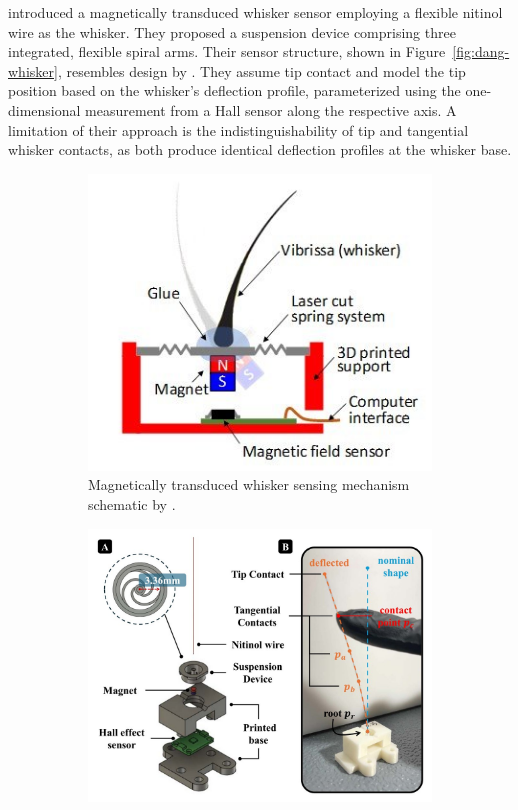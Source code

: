 \textcite{dang2025whisker} introduced a magnetically transduced whisker sensor employing a flexible nitinol wire as the whisker.
They proposed a suspension device comprising three integrated, flexible spiral arms.
Their sensor structure, shown in Figure~\ref{fig:dang-whisker}, resembles design by \citeauthor{8968518}.
They assume tip contact and model the tip position based on the whisker's deflection profile, parameterized using the one-dimensional measurement from a Hall sensor along the respective axis.
A limitation of their approach is the indistinguishability of tip and tangential whisker contacts, as both produce identical deflection profiles at the whisker base.

\begin{figure}[htb]
    \centering
    \begin{subfigure}{0.48\textwidth}
        \centering
        \includegraphics[width=\textwidth]{figures/kim-velez-whisker}
        \caption{Magnetically transduced whisker sensing mechanism schematic by \textcite{8968518}.}
        \label{fig:kim-whisker}
    \end{subfigure}\hfill
    \begin{subfigure}{0.48\textwidth}
        \centering
        \includegraphics[width=\textwidth]{figures/dang-whisker}

\end{subfigure}
\end{figure}
